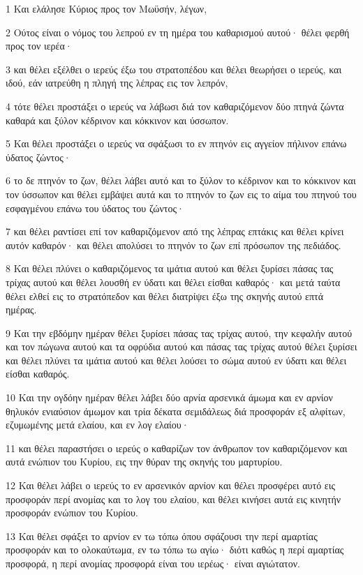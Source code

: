 \par 1 Και ελάλησε Κύριος προς τον Μωϋσήν, λέγων,
\par 2 Ούτος είναι ο νόμος του λεπρού εν τη ημέρα του καθαρισμού αυτού· θέλει φερθή προς τον ιερέα·
\par 3 και θέλει εξέλθει ο ιερεύς έξω του στρατοπέδου και θέλει θεωρήσει ο ιερεύς, και ιδού, εάν ιατρεύθη η πληγή της λέπρας εις τον λεπρόν,
\par 4 τότε θέλει προστάξει ο ιερεύς να λάβωσι διά τον καθαριζόμενον δύο πτηνά ζώντα καθαρά και ξύλον κέδρινον και κόκκινον και ύσσωπον.
\par 5 Και θέλει προστάξει ο ιερεύς να σφάξωσι το εν πτηνόν εις αγγείον πήλινον επάνω ύδατος ζώντος·
\par 6 το δε πτηνόν το ζων, θέλει λάβει αυτό και το ξύλον το κέδρινον και το κόκκινον και τον ύσσωπον και θέλει εμβάψει αυτά και το πτηνόν το ζων εις το αίμα του πτηνού του εσφαγμένου επάνω του ύδατος του ζώντος·
\par 7 και θέλει ραντίσει επί τον καθαριζόμενον από της λέπρας επτάκις και θέλει κρίνει αυτόν καθαρόν· και θέλει απολύσει το πτηνόν το ζων επί πρόσωπον της πεδιάδος.
\par 8 Και θέλει πλύνει ο καθαριζόμενος τα ιμάτια αυτού και θέλει ξυρίσει πάσας τας τρίχας αυτού και θέλει λουσθή εν ύδατι και θέλει είσθαι καθαρός· και μετά ταύτα θέλει ελθεί εις το στρατόπεδον και θέλει διατρίψει έξω της σκηνής αυτού επτά ημέρας.
\par 9 Και την εβδόμην ημέραν θέλει ξυρίσει πάσας τας τρίχας αυτού, την κεφαλήν αυτού και τον πώγωνα αυτού και τα οφρύδια αυτού και πάσας τας τρίχας αυτού θέλει ξυρίσει και θέλει πλύνει τα ιμάτια αυτού και θέλει λούσει το σώμα αυτού εν ύδατι και θέλει είσθαι καθαρός.
\par 10 Και την ογδόην ημέραν θέλει λάβει δύο αρνία αρσενικά άμωμα και εν αρνίον θηλυκόν ενιαύσιον άμωμον και τρία δέκατα σεμιδάλεως διά προσφοράν εξ αλφίτων, εζυμωμένης μετά ελαίου, και εν λογ ελαίου·
\par 11 και θέλει παραστήσει ο ιερεύς ο καθαρίζων τον άνθρωπον τον καθαριζόμενον και αυτά ενώπιον του Κυρίου, εις την θύραν της σκηνής του μαρτυρίου.
\par 12 Και θέλει λάβει ο ιερεύς το εν αρσενικόν αρνίον και θέλει προσφέρει αυτό εις προσφοράν περί ανομίας και το λογ του ελαίου, και θέλει κινήσει αυτά εις κινητήν προσφοράν ενώπιον του Κυρίου.
\par 13 Και θέλει σφάξει το αρνίον εν τω τόπω όπου σφάζουσι την περί αμαρτίας προσφοράν και το ολοκαύτωμα, εν τω τόπω τω αγίω· διότι καθώς η περί αμαρτίας προσφορά, η περί ανομίας προσφορά είναι του ιερέως· είναι αγιώτατον.
